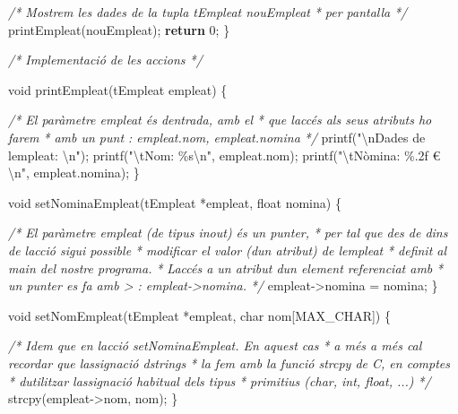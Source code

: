 \documentclass[]{book}
\newenvironment{Shaded}{\begin{snugshade}}{\end{snugshade}}
\newcommand{\CommentTok}[1]{\textcolor[rgb]{0.56,0.35,0.01}{\textit{#1}}}
\newcommand{\ControlFlowTok}[1]{\textcolor[rgb]{0.13,0.29,0.53}{\textbf{#1}}}
\newcommand{\DataTypeTok}[1]{\textcolor[rgb]{0.13,0.29,0.53}{#1}}
\newcommand{\DecValTok}[1]{\textcolor[rgb]{0.00,0.00,0.81}{#1}}
\newcommand{\NormalTok}[1]{#1}
\newcommand{\SpecialCharTok}[1]{\textcolor[rgb]{0.00,0.00,0.00}{#1}}
\newcommand{\StringTok}[1]{\textcolor[rgb]{0.31,0.60,0.02}{#1}}
\begin{document}
\begin{Shaded}
\begin{Highlighting}[]
    \CommentTok{/* Mostrem les dades de la tupla tEmpleat nouEmpleat}
\CommentTok{     * per pantalla }
\CommentTok{     */}
\NormalTok{    printEmpleat(nouEmpleat);}
    \ControlFlowTok{return} \DecValTok{0}\NormalTok{;}
\NormalTok{\}}

\CommentTok{/* Implementació de les accions */}

\DataTypeTok{void}\NormalTok{ printEmpleat(tEmpleat empleat) \{}
    
    \CommentTok{/* El paràmetre empleat és d\textquotesingle{}entrada, amb el}
\CommentTok{     * que l\textquotesingle{}accés als seus atributs ho farem}
\CommentTok{     * amb un punt : empleat.nom, empleat.nomina }
\CommentTok{     */}
\NormalTok{    printf(}\StringTok{"}\SpecialCharTok{\textbackslash{}n}\StringTok{Dades de l\textquotesingle{}empleat: }\SpecialCharTok{\textbackslash{}n}\StringTok{"}\NormalTok{);}
\NormalTok{    printf(}\StringTok{"}\SpecialCharTok{\textbackslash{}t}\StringTok{Nom: \%s}\SpecialCharTok{\textbackslash{}n}\StringTok{"}\NormalTok{, empleat.nom);}
\NormalTok{    printf(}\StringTok{"}\SpecialCharTok{\textbackslash{}t}\StringTok{Nòmina: \%.2f €}\SpecialCharTok{\textbackslash{}n}\StringTok{"}\NormalTok{, empleat.nomina);}
\NormalTok{\}}

\DataTypeTok{void}\NormalTok{ setNominaEmpleat(tEmpleat *empleat, }\DataTypeTok{float}\NormalTok{ nomina) \{}
    
    \CommentTok{/* El paràmetre empleat (de tipus inout) és un punter,}
\CommentTok{     * per tal que des de dins de l\textquotesingle{}acció sigui possible}
\CommentTok{     * modificar el valor (d\textquotesingle{}un atribut) de l\textquotesingle{}empleat}
\CommentTok{     * definit al main del nostre programa.}
\CommentTok{     * L\textquotesingle{}accés a un atribut d\textquotesingle{}un element referenciat amb}
\CommentTok{     * un punter es fa amb \textquotesingle{}{-}\textgreater{}\textquotesingle{} : empleat{-}\textgreater{}nomina. }
\CommentTok{     */}
\NormalTok{    empleat{-}\textgreater{}nomina = nomina;}
\NormalTok{\}}

\DataTypeTok{void}\NormalTok{ setNomEmpleat(tEmpleat *empleat, }\DataTypeTok{char}\NormalTok{ nom[MAX\_CHAR]) \{}

    \CommentTok{/* Idem que en l\textquotesingle{}acció setNominaEmpleat. En aquest cas}
\CommentTok{     * a més a més cal recordar que l\textquotesingle{}assignació d\textquotesingle{}strings}
\CommentTok{     * la fem amb la funció strcpy de C, en comptes }
\CommentTok{     * d\textquotesingle{}utilitzar l\textquotesingle{}assignació habitual dels tipus }
\CommentTok{     * primitius (char, int, float, ...) }
\CommentTok{     */}
\NormalTok{    strcpy(empleat{-}\textgreater{}nom, nom);}
\NormalTok{\}}
\end{Highlighting}
\end{Shaded}
\end{document}
